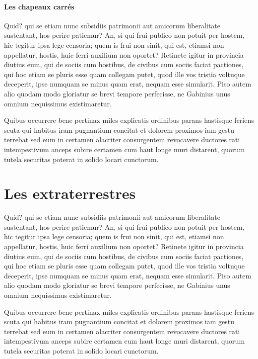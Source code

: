 \documentclass{framatexclass}
\begin{document}
\subsubsection{Les chapeaux carrés}
Quid? qui se etiam nunc subsidiis patrimonii aut amicorum liberalitate sustentant, hos perire patiemur? An, si qui frui publico non potuit per hostem, hic tegitur ipsa lege censoria; quem is frui non sinit, qui est, etiamsi non appellatur, hostis, huic ferri auxilium non oportet? Retinete igitur in provincia diutius eum, qui de sociis cum hostibus, de civibus cum sociis faciat pactiones, qui hoc etiam se pluris esse quam collegam putet, quod ille vos tristia voltuque deceperit, ipse numquam se minus quam erat, nequam esse simularit. Piso autem alio quodam modo gloriatur se brevi tempore perfecisse, ne Gabinius unus omnium nequissimus existimaretur.

Quibus occurrere bene pertinax miles explicatis ordinibus parans hastisque feriens scuta qui habitus iram pugnantium concitat et dolorem proximos iam gestu terrebat sed eum in certamen alacriter consurgentem revocavere ductores rati intempestivum anceps subire certamen cum haut longe muri distarent, quorum tutela securitas poterat in solido locari cunctorum.




\chapter{Les extraterrestres}
Quid? qui se etiam nunc subsidiis patrimonii aut amicorum liberalitate sustentant, hos perire patiemur? An, si qui frui publico non potuit per hostem, hic tegitur ipsa lege censoria; quem is frui non sinit, qui est, etiamsi non appellatur, hostis, huic ferri auxilium non oportet? Retinete igitur in provincia diutius eum, qui de sociis cum hostibus, de civibus cum sociis faciat pactiones, qui hoc etiam se pluris esse quam collegam putet, quod ille vos tristia voltuque deceperit, ipse numquam se minus quam erat, nequam esse simularit. Piso autem alio quodam modo gloriatur se brevi tempore perfecisse, ne Gabinius unus omnium nequissimus existimaretur.

Quibus occurrere bene pertinax miles explicatis ordinibus parans hastisque feriens scuta qui habitus iram pugnantium concitat et dolorem proximos iam gestu terrebat sed eum in certamen alacriter consurgentem revocavere ductores rati intempestivum anceps subire certamen cum haut longe muri distarent, quorum tutela securitas poterat in solido locari cunctorum.
\end{document}
